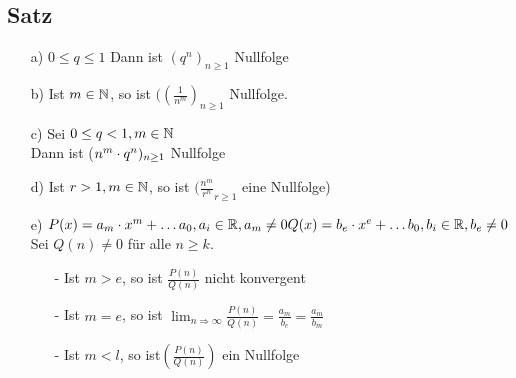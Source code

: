 \subsection[Satz: Kriterien für Nullfolgen]{Satz}\label{sec:2.9}
\begin{enumerate}
\item[a)] $0 \leq q \leq 1$ Dann ist $(q^n)_{n \geq 1}$ Nullfolge
\item[b)]Ist $m \in \mathbb{N}$, so ist $((\frac{1}{n^m})_{n \geq 1}$ Nullfolge.
\item[c)]Sei $0 \leq q < 1, m \in \mathbb{N}$\\
Dann ist ($n^m \cdot q^n)_{n \geq 1}$ Nullfolge
\item[d)] Ist $r > 1, m \in \mathbb{N}$, so ist $(\frac{n^m}{r^n}_{r \geq 1}$ eine Nullfolge)
\item[e)] $P(x) = a_m \cdot x^m + \ldots a_0, a_i \in \mathbb{R}, a_m \not = 0\\
Q(x) = b_e \cdot x^e + \ldots b_0 , b_i \in \mathbb{R} , b_e \not = 0$\\
Sei $Q(n) \not = 0 $ f\"ur alle $n \geq k.$\\
\begin{enumerate}
\item[-]Ist $m>e$, so ist $\frac{P(n)}{Q(n)}$ nicht konvergent
\item[-]Ist $m = e$, so ist $\lim_{n\Rightarrow \infty} \frac{P(n)}{Q(n)}= \frac{a_m}{b_e} = \frac{a_m}{b_m}$\\
\item[-]Ist $m < l$, so ist$ (\frac{P(n)}{Q(n)})$ ein Nullfolge
\end{enumerate}
\end{enumerate}
